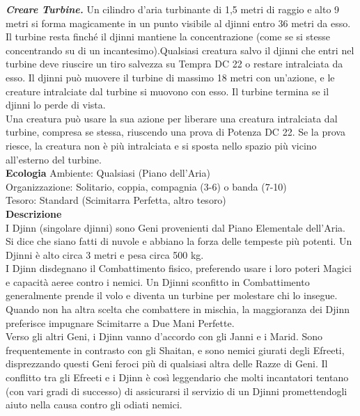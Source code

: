 \begin{multicols}{2}
\emph{\textbf{Creare Turbine.}} Un cilindro d'aria turbinante di 1,5 metri di raggio e alto 9 metri si forma magicamente in un punto visibile al djinni entro 36 metri da esso. Il turbine resta finché il djinni mantiene la concentrazione (come se si stesse concentrando su di un incantesimo).Qualsiasi creatura salvo il djinni che entri nel turbine  deve riuscire un tiro salvezza su Tempra DC  22 o restare intralciata da esso. Il djinni può muovere il turbine di massimo 18 metri con un'azione, e le creature intralciate dal turbine si muovono con esso. Il turbine termina se il djinni lo perde di vista.\\
Una creatura può usare la sua azione per liberare una creatura intralciata dal turbine, compresa se stessa, riuscendo una prova di Potenza DC  22. Se la prova riesce, la creatura non è più intralciata e si sposta nello spazio più vicino all'esterno del turbine.\\
\textbf{Ecologia}
Ambiente: Qualsiasi (Piano dell'Aria)\\
Organizzazione: Solitario, coppia, compagnia (3-6) o banda (7-10)\\
Tesoro: Standard (Scimitarra Perfetta, altro tesoro)\\
\textbf{Descrizione}\\
I Djinn (singolare djinni) sono Geni provenienti dal Piano Elementale dell’Aria. Si dice che siano fatti di nuvole e abbiano la forza delle tempeste più potenti. Un Djinni è alto circa 3 metri e pesa circa 500 kg.\\

I Djinn disdegnano il Combattimento fisico, preferendo usare i loro poteri Magici e capacità aeree contro i nemici. Un Djinni sconfitto in Combattimento generalmente prende il volo e diventa un turbine per molestare chi lo insegue. Quando non ha altra scelta che combattere in mischia, la maggioranza dei Djinn preferisce impugnare Scimitarre a Due Mani Perfette.\\

Verso gli altri Geni, i Djinn vanno d’accordo con gli Janni e i Marid. Sono frequentemente in contrasto con gli Shaitan, e sono nemici giurati degli Efreeti, disprezzando questi Geni feroci più di qualsiasi altra delle Razze di Geni. Il conflitto tra gli Efreeti e i Djinn è così leggendario che molti incantatori tentano (con vari gradi di successo) di assicurarsi il servizio di un Djinni promettendogli aiuto nella causa contro gli odiati nemici.\\


\end{multicols}
